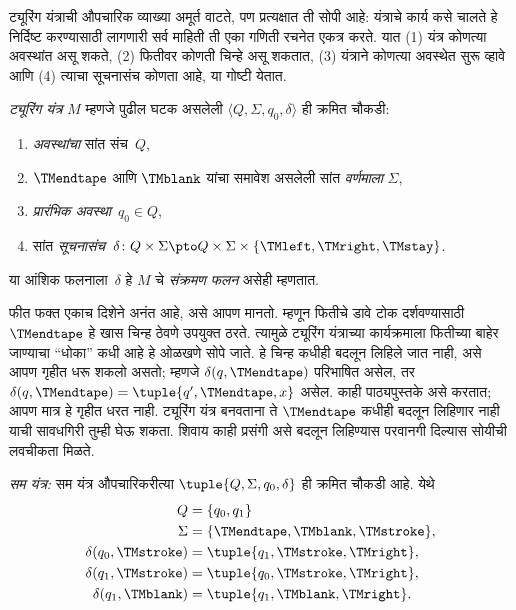 \begin{explain}
ट्यूरिंग यंत्राची औपचारिक व्याख्या अमूर्त वाटते, पण प्रत्यक्षात
ती सोपी आहे: यंत्राचे कार्य कसे चालते हे निर्दिष्ट करण्यासाठी लागणारी
सर्व माहिती ती एका गणिती रचनेत एकत्र करते. यात (1) यंत्र कोणत्या
अवस्थांत असू शकते, (2) फितीवर कोणती चिन्हे असू शकतात, (3) यंत्राने
कोणत्या अवस्थेत सुरू व्हावे आणि (4) त्याचा सूचनासंच कोणता आहे,
या गोष्टी येतात.
\end{explain}

\begin{defn}[ट्यूरिंग यंत्र]
\emph{ट्यूरिंग यंत्र} $M$ म्हणजे पुढील घटक असलेली
$\langle Q, \Sigma, q_0,
\delta\rangle$ ही क्रमित चौकडी:
\begin{enumerate}
\item \emph{अवस्थांचा} सांत संच~$Q$,
\item $\TMendtape$ आणि $\TMblank$ यांचा समावेश असलेली सांत
  \emph{वर्णमाला} $\Sigma$,
\item \emph{प्रारंभिक अवस्था}~$q_0 \in Q$,
\item सांत \emph{सूचनासंच}~$\delta\colon Q \times \Sigma
  \pto Q \times \Sigma \times \{\TMleft, \TMright, \TMstay\}$.
\end{enumerate}
या आंशिक फलनाला~$\delta$ हे $M$ चे \emph{संक्रमण फलन} असेही म्हणतात.
\end{defn}

\begin{explain}
फीत फक्त एकाच दिशेने अनंत आहे, असे आपण मानतो. म्हणून फितीचे
डावे टोक दर्शवण्यासाठी $\TMendtape$ हे खास चिन्ह ठेवणे उपयुक्त ठरते.
त्यामुळे ट्यूरिंग यंत्राच्या कार्यक्रमाला फितीच्या बाहेर जाण्याचा
``धोका'' कधी आहे हे ओळखणे सोपे जाते. हे चिन्ह कधीही बदलून लिहिले
जात नाही, असे आपण गृहीत धरू शकलो असतो; म्हणजे
$\delta(q,\TMendtape)$ परिभाषित असेल, तर
$\delta(q,\TMendtape) = \tuple{q', \TMendtape, x}$ असेल.
काही पाठ्यपुस्तके असे करतात; आपण मात्र हे गृहीत धरत नाही. ट्यूरिंग
यंत्र बनवताना ते $\TMendtape$ कधीही बदलून लिहिणार नाही याची
सावधगिरी तुम्ही घेऊ शकता. शिवाय काही प्रसंगी असे बदलून लिहिण्यास
परवानगी दिल्यास सोयीची लवचीकता मिळते.
\end{explain}

\begin{ex}
\emph{सम यंत्र:} सम यंत्र औपचारिकरीत्या
$\tuple{Q, \Sigma, q_0, \delta}$ ही क्रमित चौकडी आहे. येथे
\begin{align*}
Q & = \{ q_0, q_1 \} \\
\Sigma & = \{ \TMendtape, \TMblank, \TMstroke \}, \\
\delta(q_0, \TMstroke) & = \tuple{q_1, \TMstroke, \TMright},\\
\delta(q_1, \TMstroke) & = \tuple{q_0, \TMstroke, \TMright},\\
\delta(q_1, \TMblank)  & = \tuple{q_1, \TMblank, \TMright}.
\end{align*}
\end{ex}











